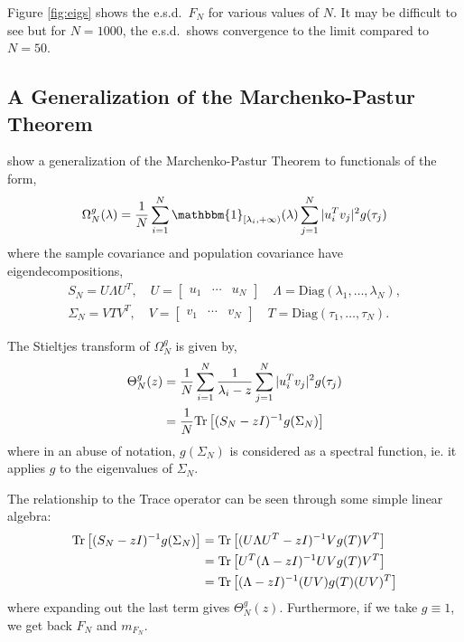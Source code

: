 \documentclass{article}
\begin{document}
Figure \ref{fig:eigs} shows the e.s.d.\ $F_N$ for various values of $N$.  It may
be difficult to see but for $N=1000$, the e.s.d.\ shows convergence to the limit
compared to $N=50$.

\subsection{A Generalization of the Marchenko-Pastur Theorem}

\cite{Ledoit2011Eigenvectors} show a generalization of the Marchenko-Pastur
Theorem to functionals of the form,
\begin{equation}\label{eq:Omega_N}
	\Omega^g_N(\lambda)
		 = \frac{1}{N}\sum_{i=1}^N \mathbbm{1}_{[\lambda_{i}, +\infty)}(\lambda)
		 			\sum_{j=1}^N |u_i^T v_j|^2 g(\tau_j)
\end{equation}
where the sample covariance and population covariance have eigendecompositions,
\begin{gather*}
	S_N = U\Lambda U^T, 
		\quad U = \begin{bmatrix} u_1 & \cdots & u_N \end{bmatrix}
		\quad \Lambda = \mathrm{Diag}(\lambda_1, \ldots, \lambda_N),\\
	\Sigma_N = V T V^T, 
		\quad V = \begin{bmatrix} v_1 & \cdots & v_N \end{bmatrix}
		\quad T = \mathrm{Diag}(\tau_1, \ldots, \tau_N).
\end{gather*}

The Stieltjes transform of $\Omega^g_N$ is given by,
\begin{align} \label{eq:Theta_N}
	\Theta^g_N(z)
		& = \frac{1}{N}\sum_{i=1}^N \frac{1}{\lambda_i - z}
		  		\sum_{j=1}^N |u_i^T v_j|^2 g(\tau_j) \\
		& = \frac{1}{N}\mathrm{Tr}\left[(S_N - zI)^{-1} g(\Sigma_N)\right]
\end{align}
where in an abuse of notation, $g(\Sigma_N)$ is considered as a spectral
function, ie. it applies $g$ to the eigenvalues of $\Sigma_N$.

The relationship to the Trace operator can be seen through some simple linear
algebra:
\begin{align*}
	\mathrm{Tr}\left[(S_N - zI)^{-1} g(\Sigma_N)\right]
		& = \mathrm{Tr}\left[( U\Lambda U^T - zI)^{-1} V g(T) V^T \right] \\
		& = \mathrm{Tr}\left[U^T(\Lambda - zI)^{-1} UV g(T) V^T \right] \\
		& = \mathrm{Tr}\left[(\Lambda - zI)^{-1} (UV) g(T) (UV)^T \right]
\end{align*}
where expanding out the last term gives $\Theta^g_N(z)$.  Furthermore, if we
take $g \equiv 1$, we get back $F_N$ and $m_{F_N}$.
\end{document}
